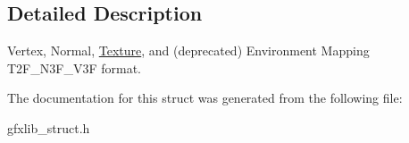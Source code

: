 \subsection{Detailed Description}
Vertex, Normal, \hyperlink{classTexture}{Texture}, and (deprecated) Environment Mapping T2\+F\+\_\+\+N3\+F\+\_\+\+V3F format. 

The documentation for this struct was generated from the following file\+:\begin{DoxyCompactItemize}
\item 
gfxlib\+\_\+struct.\+h\end{DoxyCompactItemize}
